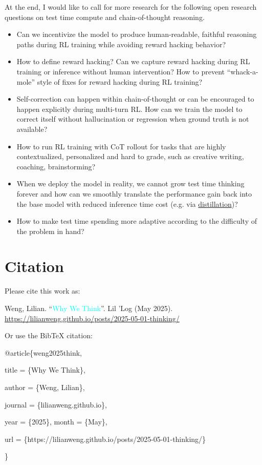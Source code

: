 \documentclass[12pt]{article}
\begin{document}
At the end, I would like to call for more research for the following open research questions on test time compute and chain-of-thought reasoning.
\begin{itemize}
    \item Can we incentivize the model to produce human-readable, faithful reasoning paths during RL training while avoiding reward hacking behavior?
    \item How to define reward hacking? Can we capture reward hacking during RL training or inference without human intervention? How to prevent ``whack-a-mole'' style of fixes for reward hacking during RL training?
    \item Self-correction can happen within chain-of-thought or can be encouraged to happen explicitly during multi-turn RL. How can we train the model to correct itself without hallucination or regression when ground truth is not available?
    \item How to run RL training with CoT rollout for tasks that are highly contextualized, personalized and hard to grade, such as creative writing, coaching, brainstorming?
    \item When we deploy the model in reality, we cannot grow test time thinking forever and how can we smoothly translate the performance gain back into the base model with reduced inference time cost (e.g. via \href{https://arxiv.org/abs/2501.12948}{distillation})?
    \item How to make test time spending more adaptive according to the difficulty of the problem in hand?
\end{itemize}

\section{Citation}
Please cite this work as:

\begin{tcolorbox}[colback=black!5!white, colframe=black!80!white, boxrule=0.5pt, arc=2mm, left=1mm, right=1mm, top=1mm, bottom=1mm]
Weng, Lilian. ``\textcolor{cyan}{Why We Think}''. Lil 'Log (May 2025). \url{https://lilianweng.github.io/posts/2025-05-01-thinking/}
\end{tcolorbox}

Or use the BibTeX citation:

\begin{tcolorbox}[
    colback=black!5!white,
    colframe=black!80!white,
    boxrule=0.5pt,
    arc=2mm,
    left=1mm,
    right=1mm,
    top=1mm,
    bottom=1mm,
    listing only,
    listing options={
      basicstyle=\ttfamily\footnotesize,
      breaklines=true,
      literate={\{}{{\char`\{}}1 {\}}{{\char`\}}}1
    }
  ]
  @article\{weng2025think,

    title   = \{Why We Think\},

    author  = \{Weng, Lilian\},

    journal = \{lilianweng.github.io\},

    year    = \{2025\},
    month   = \{May\},

    url     = \{https://lilianweng.github.io/posts/2025-05-01-thinking/\}

  \}
  \end{tcolorbox}
\end{document}
